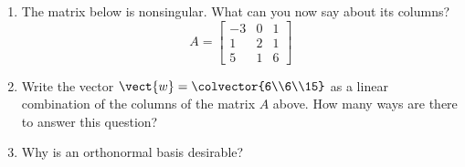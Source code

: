 \begin{enumerate}
%
\item The matrix below is nonsingular.  What can you now say about its columns?
%
\begin{equation*}
%
A= \begin{bmatrix}
-3 & 0 & 1\\
1 & 2 & 1\\
5 & 1 & 6
\end{bmatrix}
%
\end{equation*}
%
\item Write the vector $\vect{w}=\colvector{6\\6\\15}$ as a linear combination of the columns of the matrix $A$ above.  How many ways are there to answer this question?
%
\item Why is an orthonormal basis desirable?
%
\end{enumerate}